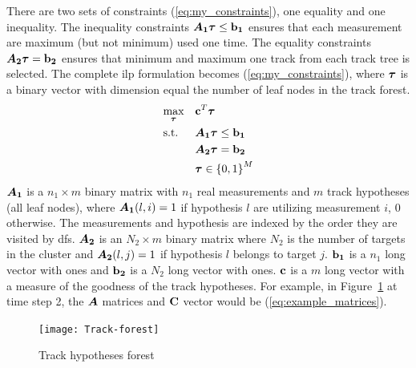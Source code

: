 There are two sets of constraints (\ref{eq:my_constraints}), one equality and one inequality. The inequality constraints \(\bm{A_1} \boldsymbol{\mathbf{\tau}} \leq \boldsymbol{\mathbf{b_1}}\) ensures that each measurement are maximum (but not minimum) used one time. The equality constraints \(\bm{A_2} \boldsymbol{\mathbf{\tau}} = \boldsymbol{\mathbf{b_2}}\) ensures that minimum and maximum one track from each track tree is selected. The complete \gls{ilp} formulation becomes (\ref{eq:my_constraints}), where \(\boldsymbol{\mathbf{\tau}}\) is a binary vector with dimension equal the number of leaf nodes in the track forest.
\begin{equation}
\begin{aligned}
&	\underset{\boldsymbol{\mathbf{\tau}}}{\text{max}}
&&	\boldsymbol{\mathbf{c}}^T \boldsymbol{\mathbf{\tau}} \\
&	\text{s.t.}
&&	\bm{A_1} \boldsymbol{\mathbf{\tau}} \leq \boldsymbol{\mathbf{b_1}} 	\\
&&&	\bm{A_2} \boldsymbol{\mathbf{\tau}} = \boldsymbol{\mathbf{b_2}}	\\
&&&	\boldsymbol{\mathbf{\tau}} \in {\{0,1\}}^{M}
\end{aligned}
\label{eq:my_constraints}
\end{equation}
\(\bm{A_1}\) is a \(n_1 \times m\) binary matrix with \(n_1\) real measurements and \(m\) track hypotheses (all leaf nodes), where \(\bm{A_1}(l,i)=1\) if hypothesis \(l\) are utilizing measurement \(i\), \(0\) otherwise. The measurements and hypothesis are indexed by the order they are visited by \gls{dfs}. \(\bm{A_2}\) is an \(N_2 \times m\) binary matrix where \(N_2\) is the number of targets in the cluster and \(\bm{A_2}(l,j)=1\) if hypothesis \(l\) belongs to target \(j\). \(\boldsymbol{\mathbf{b_1}}\) is a \(n_1\) long vector with ones and \(\boldsymbol{\mathbf{b_2}}\) is a \(N_2\) long vector with ones. \(\boldsymbol{\mathbf{c}}\) is a \(m\) long vector with a measure of the goodness of the track hypotheses. For example, in Figure~\ref{fig:hyp_forest} at time step 2, the \(\bm{A}\) matrices and \(\boldsymbol{\mathbf{C}}\) vector would be (\ref{eq:example_matrices}).
\begin{figure}[H]
\centering
\texttt{[image: Track-forest]}
\caption{Track hypotheses forest}\label{fig:hyp_forest}
\end{figure}

